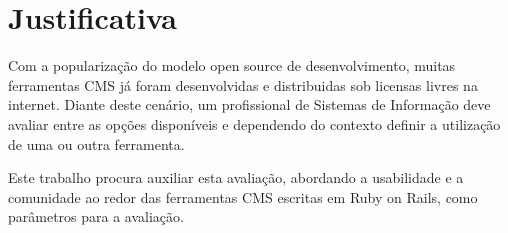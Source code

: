 \section{Justificativa}
 
Com a popularização do modelo open source de desenvolvimento, muitas ferramentas CMS já foram desenvolvidas e distribuidas sob licensas livres na internet. Diante deste cenário, um profissional de Sistemas de Informação deve avaliar entre as opções disponíveis e dependendo do contexto definir a utilização de uma ou outra ferramenta.

Este trabalho procura auxiliar esta avaliação, abordando a usabilidade e a comunidade ao redor das ferramentas CMS escritas em Ruby on Rails, como parâmetros para a avaliação. 




    
